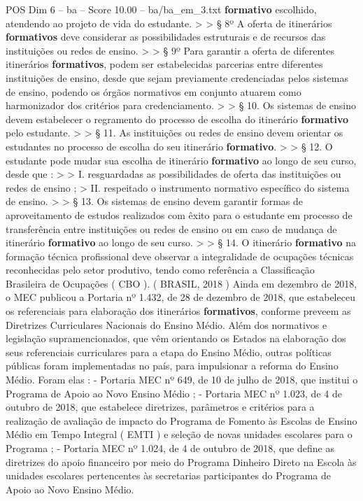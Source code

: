 \begin{textsample}{POS Dim 6 – ba – Score 10.00 – ba/ba\_em\_3.txt}
\textbf{formativo} escolhido, atendendo ao projeto de vida do estudante. > > § 8º A oferta de itinerários \textbf{formativos} deve considerar as possibilidades estruturais e de recursos das instituições ou redes de ensino. > > § 9º Para garantir a oferta de diferentes itinerários \textbf{formativos}, podem ser estabelecidas parcerias entre diferentes instituições de ensino, desde que sejam previamente credenciadas pelos sistemas de ensino, podendo os órgãos normativos em conjunto atuarem como harmonizador dos critérios para credenciamento. > > § 10.
Os sistemas de ensino devem estabelecer o regramento do processo de escolha do itinerário \textbf{formativo} pelo estudante. > > § 11.
As instituições ou redes de ensino devem orientar os estudantes no processo de escolha do seu itinerário \textbf{formativo}. > > § 12.
O estudante pode mudar sua escolha de itinerário \textbf{formativo} ao longo de seu curso, desde que : > > I. resguardadas as possibilidades de oferta das instituições ou redes de ensino ; > II. respeitado o instrumento normativo específico do sistema de ensino. > > § 13.
Os sistemas de ensino devem garantir formas de aproveitamento de estudos realizados com êxito para o estudante em processo de transferência entre instituições ou redes de ensino ou em caso de mudança de itinerário \textbf{formativo} ao longo de seu curso. > > § 14.
O itinerário \textbf{formativo} na formação técnica profissional deve observar a integralidade de ocupações técnicas reconhecidas pelo setor produtivo, tendo como referência a Classificação Brasileira de Ocupações ( CBO ). ( BRASIL, 2018 ) Ainda em dezembro de 2018, o MEC publicou a Portaria nº 1.432, de 28 de dezembro de 2018, que estabeleceu os referenciais para elaboração dos itinerários \textbf{formativos}, conforme preveem as Diretrizes Curriculares Nacionais do Ensino Médio.
Além dos normativos e legislação supramencionados, que vêm orientando os Estados na elaboração dos seus referenciais curriculares para a etapa do Ensino Médio, outras políticas públicas foram implementadas no país, para impulsionar a reforma do Ensino Médio.
Foram elas : - Portaria MEC nº 649, de 10 de julho de 2018, que institui o Programa de Apoio ao Novo Ensino Médio ; - Portaria MEC nº 1.023, de 4 de outubro de 2018, que estabelece diretrizes, parâmetros e critérios para a realização de avaliação de impacto do Programa de Fomento às Escolas de Ensino Médio em Tempo Integral ( EMTI ) e seleção de novas unidades escolares para o Programa ; - Portaria MEC nº 1.024, de 4 de outubro de 2018, que define as diretrizes do apoio financeiro por meio do Programa Dinheiro Direto na Escola às unidades escolares pertencentes às secretarias participantes do Programa de Apoio ao Novo Ensino Médio.

\end{textsample}
